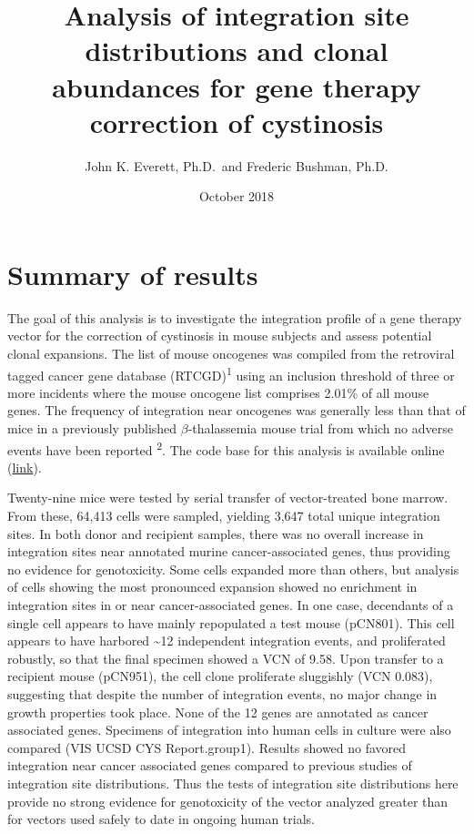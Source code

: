 \documentclass[12pt,]{article}
\title{Analysis of integration site distributions and clonal abundances for
gene therapy correction of cystinosis}
\author{John K. Everett, Ph.D.~and Frederic Bushman, Ph.D.}
\date{October 2018}
\begin{document}
\maketitle

{
\setcounter{tocdepth}{2}
\tableofcontents
}
\captionsetup[table]{labelformat=empty}

\newpage

\section{Summary of results}\label{summary-of-results}

The goal of this analysis is to investigate the integration profile of a
gene therapy vector for the correction of cystinosis in mouse subjects
and assess potential clonal expansions. The list of mouse oncogenes was
compiled from the retroviral tagged cancer gene database
(RTCGD)\textsuperscript{1} using an inclusion threshold of three or more
incidents where the mouse oncogene list comprises 2.01\% of all mouse
genes. The frequency of integration near oncogenes was generally less
than that of mice in a previously published \(\beta\)-thalassemia mouse
trial from which no adverse events have been reported
\textsuperscript{2}. The code base for this analysis is available online
(\href{https://github.com/everettJK/project.geneTherapy.ucsdMouseCystinosis}{link}).

\vspace{0.25cm}

Twenty-nine mice were tested by serial transfer of vector-treated bone
marrow. From these, 64,413 cells were sampled, yielding 3,647 total
unique integration sites. In both donor and recipient samples, there was
no overall increase in integration sites near annotated murine
cancer-associated genes, thus providing no evidence for genotoxicity.
Some cells expanded more than others, but analysis of cells showing the
most pronounced expansion showed no enrichment in integration sites in
or near cancer-associated genes. In one case, decendants of a single
cell appears to have mainly repopulated a test mouse (pCN801). This cell
appears to have harbored \textasciitilde{}12 independent integration
events, and proliferated robustly, so that the final specimen showed a
VCN of 9.58. Upon transfer to a recipient mouse (pCN951), the cell clone
proliferate sluggishly (VCN 0.083), suggesting that despite the number
of integration events, no major change in growth properties took place.
None of the 12 genes are annotated as cancer associated genes. Specimens
of integration into human cells in culture were also compared (VIS UCSD
CYS Report.group1). Results showed no favored integration near cancer
associated genes compared to previous studies of integration site
distributions. Thus the tests of integration site distributions here
provide no strong evidence for genotoxicity of the vector analyzed
greater than for vectors used safely to date in ongoing human trials.
\end{document}
